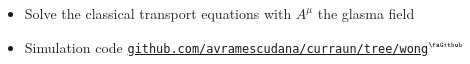 \documentclass[aspectratio=169,11pt,usenames,dvipsnames]{beamer}
\begin{document}
\begin{frame}
    \begin{itemize}\itemsep0em 
        \item \begin{center}\footnotesize Solve the classical transport equations with {\color{starrysecond}$A^\mu$} the {\color{starrysecond}glasma field}\end{center} 
        \item \begin{center}\footnotesize Simulation code \href{https://github.com/avramescudana/curraun/tree/wong}{\color{palgold}\texttt{github.com/avramescudana/curraun/tree/wong}$^\text{\tiny\faGithub}$}\end{center} 
    \end{itemize}
\end{frame}

\end{document}
